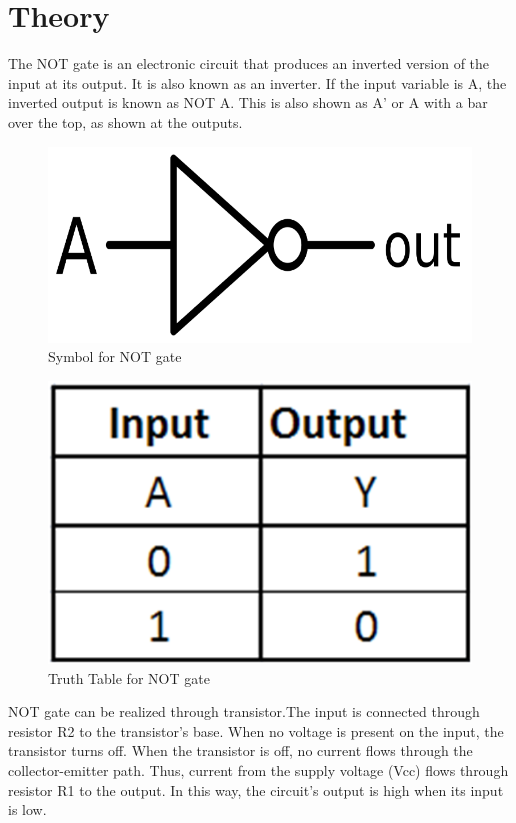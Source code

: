 \section{Theory}
	The NOT gate is an electronic circuit that produces an inverted version of the input at its output. It is also known as an inverter. If the input variable is A, the inverted output is known as NOT A. This is also shown as A' or A with a bar over the top, as shown at the outputs.
	\begin{figure}[h]
		\centering
		\includegraphics{img/exp3/1}
		\caption{Symbol for NOT gate}
		\label{fig:3:1}
	\end{figure}
	\begin{figure}[h]
		\centering
		\includegraphics{img/exp3/2}
		\caption{Truth Table for NOT gate}
		\label{fig:3:2}
	\end{figure}
	NOT gate can be realized through transistor.The input is connected through resistor R2 to the transistor’s base. When no voltage is present on the input, the transistor turns off. When the transistor is off, no current flows through the collector-emitter path. Thus, current from the supply voltage (Vcc) flows through resistor R1 to the output. In this way, the circuit’s output is high when its input is low.
	
